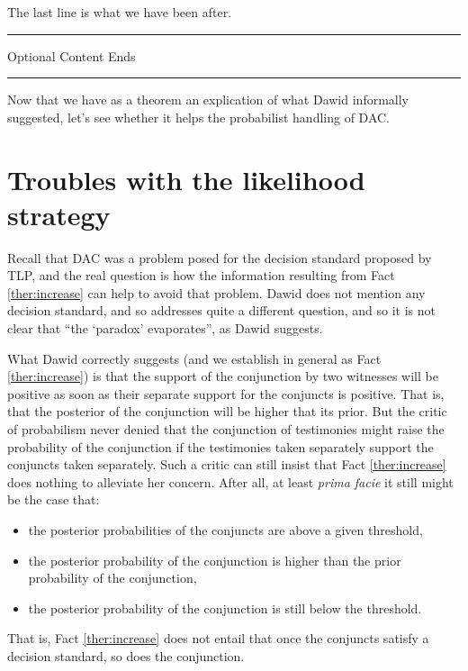 \documentclass{ifcolog}
\newcommand{\intermezzob}{\nopagebreak 
	\begin{minipage}[c]{13cm}
	\begin{center}\rule{10cm}{0.4pt}

	\tiny{\sc Optional Content Ends}
	
	\vspace{-1mm}
	
	\rule{10cm}{0.4pt}\end{center}
	\end{minipage}
	}
\begin{document}
\vspace{1mm}

The last line is what we have been after.

\intermezzob





Now that we have as a theorem an explication of what Dawid informally suggested, let's see whether it helps the probabilist handling of DAC. 




\section{Troubles with the likelihood strategy}\label{sec:likelihood_troubles}


 Recall that DAC was a problem posed for the decision standard proposed by TLP, and the real question is how the information resulting from Fact \ref{ther:increase} can help to avoid that problem.  Dawid does not mention any decision standard, and so addresses quite a different question, and so it is not clear that  ``the `paradox'  evaporates'', as Dawid suggests.

 What Dawid correctly suggests (and we establish in general as Fact \ref{ther:increase})  is that  the support of the conjunction by two witnesses will be positive as soon as their separate support for the conjuncts is positive. That is, that the posterior of the conjunction will be higher that its prior. But  the critic of probabilism never denied that the conjunction of testimonies might raise the probability of the conjunction if the testimonies taken separately support the conjuncts taken separately. Such a critic can still insist that Fact \ref{ther:increase} does nothing to alleviate her concern.  After all, at least \emph{prima facie} it still might be the case that:
\begin{itemize}
\item  the posterior probabilities of the conjuncts are above a given threshold,
\item   the posterior probability of the conjunction is higher than the prior probability of the conjunction,
\item   the posterior probability of the conjunction 
 is still below the threshold.
\end{itemize}
That is, Fact \ref{ther:increase} does not entail that once the conjuncts satisfy a decision standard, so does the conjunction. 
\end{document}
